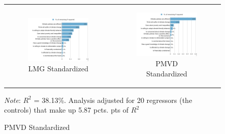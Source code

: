 \documentclass{article}
\begin{document}
\begin{figure}[h!]
\begin{center}
	\begin{tabular}{cc}
		\begin{subfigure}{0.5\textwidth}
		\caption{LMG Standardized}
			\includegraphics[width=\textwidth]{lmg_tax_transfers_standardized}
		\end{subfigure}&
		\begin{subfigure}{0.5\textwidth}
		\caption{PMVD Standardized}
			\includegraphics[width=\textwidth]{pmvd_tax_transfers_standardized}
		\end{subfigure}\\
	\end{tabular}
	{\footnotesize \textit{Note}:  $R^2$ = 38.13\%. Analysis adjusted for 20 regressors (the controls) that make up 5.87 pcts. pts of $R^2$}
\end{center}
\end{figure}
\end{document}
